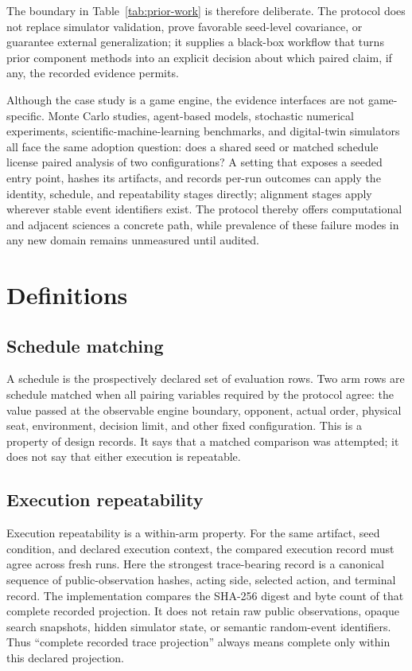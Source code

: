 \documentclass[aps,reprint,superscriptaddress,longbibliography,floatfix]{revtex4-2}
\begin{document}


The boundary in Table~\ref{tab:prior-work} is therefore deliberate.  The
protocol does not replace simulator validation, prove favorable seed-level
covariance, or guarantee external generalization; it supplies a black-box
workflow that turns prior component methods into an explicit decision about
which paired claim, if any, the recorded evidence permits.

Although the case study is a game engine, the evidence interfaces are not
game-specific.  Monte Carlo studies, agent-based models, stochastic numerical
experiments, scientific-machine-learning benchmarks, and digital-twin
simulators all face the same adoption question: does a shared seed or matched
schedule license paired analysis of two configurations?  A setting that
exposes a seeded entry point, hashes its artifacts, and records per-run
outcomes can apply the identity, schedule, and repeatability stages directly;
alignment stages apply wherever stable event identifiers exist.  The protocol
thereby offers computational and adjacent sciences a concrete path, while
prevalence of these failure modes in any new domain remains unmeasured until
audited.

\section{Definitions}

\subsection{Schedule matching}

A schedule is the prospectively declared set of evaluation rows.  Two arm rows
are schedule matched when all pairing variables required by the protocol agree:
the value passed at the observable engine boundary, opponent, actual order,
physical seat, environment, decision limit, and other fixed configuration.
This is a property of design records.  It says that a matched comparison was
attempted; it does not say that either execution is repeatable.

\subsection{Execution repeatability}

Execution repeatability is a within-arm property.  For the same artifact,
seed condition, and declared execution context, the compared execution record
must agree across fresh runs.  Here the strongest trace-bearing record is a
canonical sequence of public-observation hashes, acting side, selected action,
and terminal record.  The implementation compares the SHA-256 digest and byte
count of that complete recorded projection.  It does not retain raw public
observations, opaque search snapshots, hidden simulator state, or semantic
random-event identifiers.  Thus ``complete recorded trace projection'' always means complete only
within this declared projection.
\end{document}
